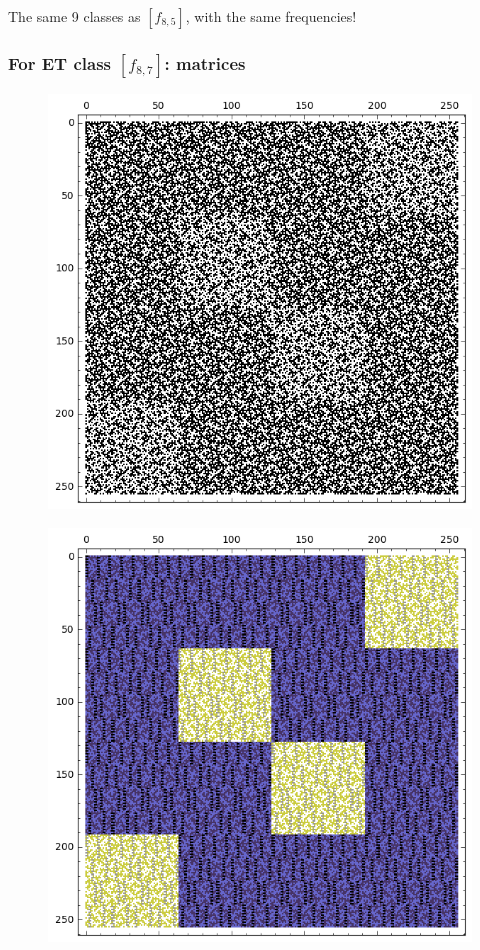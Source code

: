 \documentclass[pdf,sprung,slideColor,nocolorBG]{beamer}
\newenvironment{colortheme}[1]{
\def\ProvidesPackageRCS $##1${\relax}
\renewcommand{\ProcessOptions}{\relax}
\makeatletter

\makeatother
}{}
\begin{document}
\begin{colortheme}{jubata}
\begin{frame}
\begin{figure}
\begin{minipage}{.48\textwidth}
  \label{fig:8_6_bent_cayley_graph_index_matrix}
\end{minipage}
\end{figure}
The same 9 classes as $[f_{8,5}]$, with the same frequencies!
\end{frame}
\begin{frame}
\frametitle{For ET class $[f_{8,7}]$: matrices}
\begin{figure}
\centering
\begin{minipage}{.48\textwidth}
  \centering
  \includegraphics[width=.9\linewidth]{../matrix_plot/c8_7_weight_class_matrix.png}
  \label{fig:8_7_weight_class_matrix}
\end{minipage}%
\begin{minipage}{.48\textwidth}
  \centering
  \includegraphics[width=.9\linewidth]{../matrix_plot/c8_7_bent_cayley_graph_index_matrix.png}

\end{minipage}
\end{figure}
\end{frame}
\end{colortheme}
\end{document}
